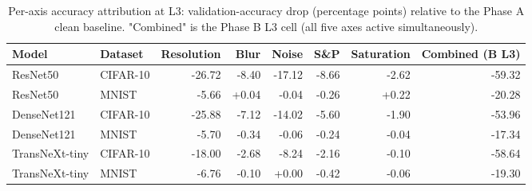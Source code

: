 \begin{table}[htbp]
\centering
\caption{Per-axis accuracy attribution at L3: validation-accuracy drop (percentage points) relative to the Phase A clean baseline. "Combined" is the Phase B L3 cell (all five axes active simultaneously).}
\label{tab:attribution}
\setlength{\tabcolsep}{4pt}
\renewcommand{\arraystretch}{1.1}
\begin{tabular}{llrrrrrr}
\toprule
Model & Dataset & Resolution & Blur & Noise & S\&P & Saturation & Combined (B L3) \\
\midrule
ResNet50 & CIFAR-10 & -26.72 & -8.40 & -17.12 & -8.66 & -2.62 & -59.32 \\
ResNet50 & MNIST & -5.66 & +0.04 & -0.04 & -0.26 & +0.22 & -20.28 \\
DenseNet121 & CIFAR-10 & -25.88 & -7.12 & -14.02 & -5.60 & -1.90 & -53.96 \\
DenseNet121 & MNIST & -5.70 & -0.34 & -0.06 & -0.24 & -0.04 & -17.34 \\
TransNeXt-tiny & CIFAR-10 & -18.00 & -2.68 & -8.24 & -2.16 & -0.10 & -58.64 \\
TransNeXt-tiny & MNIST & -6.76 & -0.10 & +0.00 & -0.42 & -0.06 & -19.30 \\
\bottomrule
\end{tabular}
\end{table}

